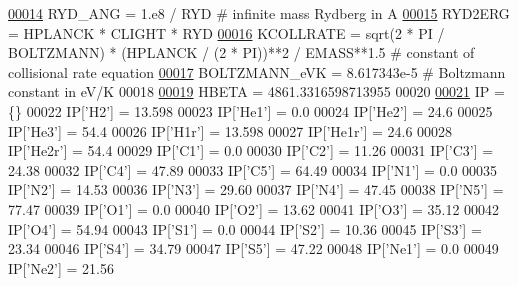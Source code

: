 \begin{DoxyCode}
\hypertarget{physics_8py_source_l00014}{}\hyperlink{classpyneb_1_1utils_1_1physics_1_1_c_s_t_a43417605886b2dc4060af9388d7990bd}{00014}     RYD\_ANG = 1.e8 / RYD \textcolor{comment}{# infinite mass Rydberg in A}
\hypertarget{physics_8py_source_l00015}{}\hyperlink{classpyneb_1_1utils_1_1physics_1_1_c_s_t_a3da260eac736f7d74c20f76f79239425}{00015}     RYD2ERG = HPLANCK * CLIGHT * RYD
\hypertarget{physics_8py_source_l00016}{}\hyperlink{classpyneb_1_1utils_1_1physics_1_1_c_s_t_a7f947f81f3596cb129cec85e6ecb78e7}{00016}     KCOLLRATE = sqrt(2 * PI / BOLTZMANN) * (HPLANCK / (2 * PI))**2 / EMASS**1.5 \textcolor{comment}{# constant of collisional
       rate equation}
\hypertarget{physics_8py_source_l00017}{}\hyperlink{classpyneb_1_1utils_1_1physics_1_1_c_s_t_aa08a3a7d69c5377fa02f0129aeec8526}{00017}     BOLTZMANN\_eVK = 8.617343e-5 \textcolor{comment}{# Boltzmann constant in eV/K}
00018     
\hypertarget{physics_8py_source_l00019}{}\hyperlink{classpyneb_1_1utils_1_1physics_1_1_c_s_t_a969cf775617cba19633611eb7fc1b10b}{00019}     HBETA = 4861.3316598713955
00020 
\hypertarget{physics_8py_source_l00021}{}\hyperlink{namespacepyneb_1_1utils_1_1physics_a041738a1b0abdb597dd654aec4d96757}{00021} IP = \{\}
00022 IP[\textcolor{stringliteral}{'H2'}] = 13.598
00023 IP[\textcolor{stringliteral}{'He1'}] = 0.0
00024 IP[\textcolor{stringliteral}{'He2'}] = 24.6
00025 IP[\textcolor{stringliteral}{'He3'}] = 54.4
00026 IP[\textcolor{stringliteral}{'H1r'}] = 13.598
00027 IP[\textcolor{stringliteral}{'He1r'}] = 24.6
00028 IP[\textcolor{stringliteral}{'He2r'}] = 54.4
00029 IP[\textcolor{stringliteral}{'C1'}] = 0.0
00030 IP[\textcolor{stringliteral}{'C2'}] = 11.26
00031 IP[\textcolor{stringliteral}{'C3'}] = 24.38
00032 IP[\textcolor{stringliteral}{'C4'}] = 47.89
00033 IP[\textcolor{stringliteral}{'C5'}] = 64.49
00034 IP[\textcolor{stringliteral}{'N1'}] = 0.0
00035 IP[\textcolor{stringliteral}{'N2'}] = 14.53
00036 IP[\textcolor{stringliteral}{'N3'}] = 29.60
00037 IP[\textcolor{stringliteral}{'N4'}] = 47.45
00038 IP[\textcolor{stringliteral}{'N5'}] = 77.47
00039 IP[\textcolor{stringliteral}{'O1'}] = 0.0
00040 IP[\textcolor{stringliteral}{'O2'}] = 13.62
00041 IP[\textcolor{stringliteral}{'O3'}] = 35.12
00042 IP[\textcolor{stringliteral}{'O4'}] = 54.94
00043 IP[\textcolor{stringliteral}{'S1'}] = 0.0
00044 IP[\textcolor{stringliteral}{'S2'}] = 10.36
00045 IP[\textcolor{stringliteral}{'S3'}] = 23.34
00046 IP[\textcolor{stringliteral}{'S4'}] = 34.79
00047 IP[\textcolor{stringliteral}{'S5'}] = 47.22
00048 IP[\textcolor{stringliteral}{'Ne1'}] = 0.0
00049 IP[\textcolor{stringliteral}{'Ne2'}] = 21.56

\end{DoxyCode}
